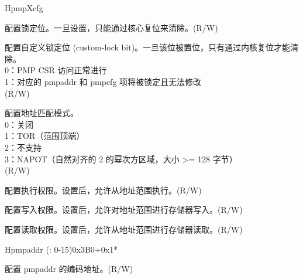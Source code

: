 \begin{register}{H}{pmpXcfg}{}
\label{regdesc:pmpXcfg}%
%
%
%
%
%
%
%
\regnewline%
\begin{regdesc}
\begin{reglist}
\label{fielddesc:pmpXcfgL}\item [L] 配置锁定位。一旦设置，只能通过核心复位来清除。(R/W)
\label{fielddesc:pmpXcfgXL}\item [XL] 配置自定义锁定位 (custom-lock bit)。一旦该位被置位，只有通过内核复位才能清除。\\
0：PMP CSR 访问正常进行\\
1：对应的 pmpaddr 和 pmpcfg 项将被锁定且无法修改\\
(R/W)
\label{fielddesc:pmpXcfgA}\item [A] 配置地址匹配模式。 \\
0：关闭 \\
1：TOR（范围顶端）\\
2：不支持 \\
3：NAPOT（自然对齐的 2 的幂次方区域，大小 >= 128 字节）\\
(R/W)
\label{fielddesc:pmpXcfgX}\item [X] 配置执行权限。设置后，允许从地址范围执行。(R/W)
\label{fielddesc:pmpXcfgW}\item [W] 配置写入权限。设置后，允许对地址范围进行存储器写入。(R/W)
\label{fielddesc:pmpXcfgR}\item [R] 配置读取权限。设置后，允许从地址范围进行存储器读取。(R/W)
\end{reglist}
\end{regdesc}
\end{register}

\begin{register}{H}{pmpaddr (: 0-15)}{0x3B0+0x1*}\label{regdesc:pmpaddrN}
%
\regnewline%
\begin{regdesc}\begin{reglist}
\label{fielddesc:ADDR}\item [address] 配置 pmpaddr 的编码地址。(R/W)
\end{reglist}\end{regdesc}
\end{register}